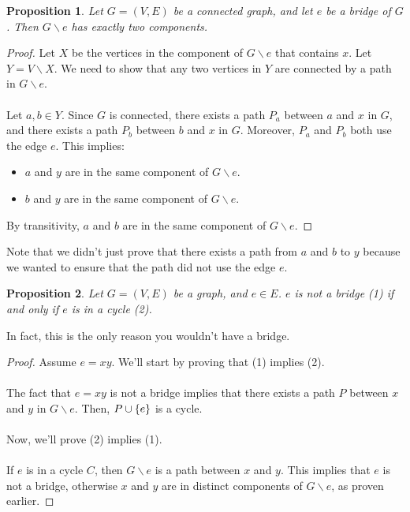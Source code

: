 \documentclass[]{article}
\newtheorem*{proposition}{Proposition}
\theoremstyle{definition}
\DeclarePairedDelimiter{\set}{\lbrace}{\rbrace}
\begin{document}
				\begin{proposition}
					Let $G = (V, E)$ be a connected graph, and let $e$ be a bridge of $G$. Then $G \backslash e$ has exactly two components.
				\end{proposition}

				\begin{proof}
					Let $X$ be the vertices in the component of $G \backslash e$ that contains $x$. Let $Y = V \backslash X$. We need to show that any two vertices in $Y$ are connected by a path in $G \backslash e$.
					\\ \\
					Let $a, b \in Y$. Since $G$ is connected, there exists a path $P_a$ between $a$ and $x$ in $G$, and there exists a path $P_b$ between $b$ and $x$ in $G$. Moreover, $P_a$ and $P_b$ both use the edge $e$. This implies:
					\begin{itemize}
						\item $a$ and $y$ are in the same component of $G \backslash e$.
						\item $b$ and $y$ are in the same component of $G \backslash e$.
					\end{itemize}

					By transitivity, $a$ and $b$ are in the same component of $G \backslash e$.
				\end{proof}

				Note that we didn't just prove that there exists a path from $a$ and $b$ to $y$ because we wanted to ensure that the path did not use the edge $e$.

				\begin{proposition}
					Let $G = (V, E)$ be a graph, and $e \in E$. $e$ is \emph{not} a bridge (1) if and only if $e$ is in a cycle (2).
				\end{proposition}
				
				In fact, this is the only reason you wouldn't have a bridge.

				\begin{proof}
					Assume $e = xy$. We'll start by proving that (1) implies (2).
					\\ \\
					The fact that $e = xy$ is not a bridge implies that there exists a path $P$ between $x$ and $y$ in $G \backslash e$. Then, $P \cup \set{e}$ is a cycle.
					\\ \\
					Now, we'll prove (2) implies (1).
					\\ \\
					If $e$ is in a cycle $C$, then $G \backslash e$ is a path between $x$ and $y$. This implies that $e$ is not a bridge, otherwise $x$ and $y$ are in distinct components of $G \backslash e$, as proven earlier.
				\end{proof}
\end{document}
